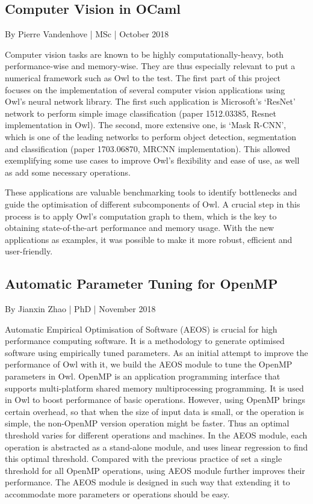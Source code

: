 \hypertarget{Computer Vision in OCaml}{%
\subsection{Computer Vision in OCaml}\label{theses-vision}}

By Pierre Vandenhove | MSc | October 2018

Computer vision tasks are known to be highly computationally-heavy, both performance-wise and memory-wise. They are thus especially relevant to put a numerical framework such as Owl to the test. The first part of this project focuses on the implementation of several computer vision applications using Owl's neural network library. The first such application is Microsoft's ‘ResNet' network to perform simple image classification (paper 1512.03385, Resnet implementation in Owl). The second, more extensive one, is ‘Mask R-CNN', which is one of the leading networks to perform object detection, segmentation and classification (paper 1703.06870, MRCNN implementation). This allowed exemplifying some use cases to improve Owl's flexibility and ease of use, as well as add some necessary operations.

These applications are valuable benchmarking tools to identify bottlenecks and guide the optimisation of different subcomponents of Owl. A crucial step in this process is to apply Owl's computation graph to them, which is the key to obtaining state-of-the-art performance and memory usage. With the new applications as examples, it was possible to make it more robust, efficient and user-friendly.


\hypertarget{Automatic Parameter Tuning for OpenMP}{%
\subsection{Automatic Parameter Tuning for OpenMP}\label{theses-aeos}}

By Jianxin Zhao | PhD | November 2018

Automatic Empirical Optimisation of Software (AEOS) is crucial for high performance computing software. It is a methodology to generate optimised software using empirically tuned parameters. As an initial attempt to improve the performance of Owl with it, we build the AEOS module to tune the OpenMP parameters in Owl. OpenMP is an application programming interface that supports multi-platform shared memory multiprocessing programming. It is used in Owl to boost performance of basic operations. However, using OpenMP brings certain overhead, so that when the size of input data is small, or the operation is simple, the non-OpenMP version operation might be faster. Thus an optimal threshold varies for different operations and machines. In the AEOS module, each operation is abstracted as a stand-alone module, and uses linear regression to find this optimal threshold. Compared with the previous practice of set a single threshold for all OpenMP operations, using AEOS module further improves their performance. The AEOS module is designed in such way that extending it to accommodate more parameters or operations should be easy.


